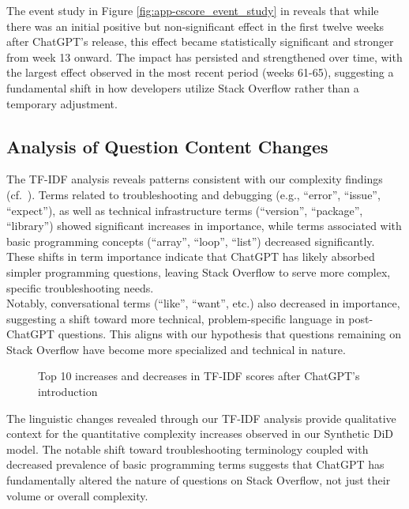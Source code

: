 The event study in Figure \ref{fig:app-cscore_event_study}  in  reveals that while there was an initial positive but non-significant effect in the first twelve weeks after ChatGPT's release, this effect became statistically significant and stronger from week 13 onward. The impact has persisted and strengthened over time, with the largest effect observed in the most recent period (weeks 61-65), suggesting a fundamental shift in how developers utilize Stack Overflow rather than a temporary adjustment.


\subsection{Analysis of Question Content Changes}

The TF-IDF analysis reveals patterns consistent with our complexity findings (cf.~). Terms related to troubleshooting and debugging (e.g., \enquote{error}, \enquote{issue}, \enquote{expect}), as well as technical infrastructure terms (\enquote{version}, \enquote{package}, \enquote{library}) showed significant increases in importance, while terms associated with basic programming concepts (\enquote{array}, \enquote{loop}, \enquote{list}) decreased significantly. These shifts in term importance indicate that ChatGPT has likely absorbed simpler programming questions, leaving Stack Overflow to serve more complex, specific troubleshooting needs.\\

Notably, conversational terms (\enquote{like}, \enquote{want}, etc.) also decreased in importance, suggesting a shift toward more technical, problem-specific language in post-ChatGPT questions. This aligns with our hypothesis that questions remaining on Stack Overflow have become more specialized and technical in nature.

\begin{figure}[H]
    \centering
    
    \caption{Top 10 increases and decreases in TF-IDF scores after ChatGPT's introduction}
    \label{fig:tfidf}
\end{figure}

The linguistic changes revealed through our TF-IDF analysis provide qualitative context for the quantitative complexity increases observed in our Synthetic DiD model. The notable shift toward troubleshooting terminology coupled with decreased prevalence of basic programming terms suggests that ChatGPT has fundamentally altered the nature of questions on Stack Overflow, not just their volume or overall complexity.

